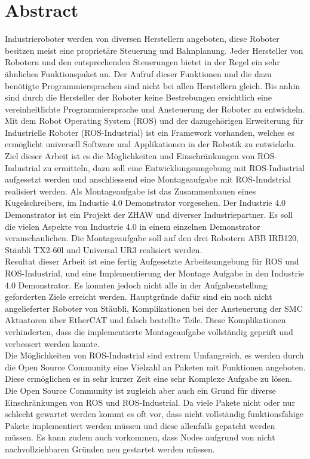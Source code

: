 \chapter*{Abstract}
\label{sec:Abstract}
Industrieroboter werden von diversen Herstellern angeboten, diese Roboter besitzen meist eine proprietäre Steuerung und Bahnplanung. Jeder Hersteller von Robotern und den entsprechenden Steuerungen bietet in der Regel ein sehr ähnliches Funktionspaket an. Der Aufruf dieser Funktionen und die dazu benötigte Programmiersprachen sind nicht bei allen Herstellern gleich. Bis anhin sind durch die Hersteller der Roboter keine Bestrebungen ersichtlich eine vereinheitlichte Programmiersprache und Ansteuerung der Roboter zu entwickeln.
Mit dem Robot Operating System (ROS) und der dazugehörigen Erweiterung für Industrielle Roboter (ROS-Industrial) ist ein Framework vorhanden, welches es ermöglicht universell Software und Applikationen in der Robotik zu entwickeln. \\

Ziel dieser Arbeit ist es die Möglichkeiten und Einschränkungen von ROS-Industrial zu ermitteln, dazu soll eine Entwicklungsumgebung mit ROS-Industrial aufgesetzt werden und anschliessend eine Montageaufgabe mit ROS-Inudstrial realisiert werden. Als Montageaufgabe ist das Zusammenbauen eines Kugelschreibers, im Industie 4.0 Demonstrator vorgesehen. Der Industrie 4.0 Demonstrator ist ein Projekt der ZHAW und diverser Industriepartner. Es soll die vielen Aspekte von Industrie 4.0 in einem einzelnen Demonstrator veranschaulichen. Die Montageaufgabe soll auf den drei Robotern ABB IRB120, Stäubli TX2-60l und Universal UR3 realisiert werden.\\

Resultat dieser Arbeit ist eine fertig Aufgesetzte Arbeitsumgebung für ROS und ROS-Industrial, und eine Implementierung der Montage Aufgabe in den Industrie 4.0 Demonstrator. Es konnten jedoch nicht alle in der Aufgabenstellung geforderten Ziele erreicht werden. Hauptgründe dafür sind ein noch nicht angelieferter Roboter von Stäubli, Komplikationen bei der Ansteuerung der SMC Aktuatoren über EtherCAT und falsch bestellte Teile. Diese Komplikationen verhinderten, dass die implementierte Montageaufgabe vollständig geprüft und verbessert werden konnte. \\

Die Möglichkeiten von ROS-Industrial sind extrem Umfangreich, es werden durch die Open Source Community eine Vielzahl an Paketen mit Funktionen angeboten. Diese ermöglichen es in sehr kurzer Zeit eine sehr Komplexe Aufgabe zu lösen. 
Die Open Source Community ist zugleich aber auch ein Grund für diverse Einschränkungen von ROS und ROS-Industrial. Da viele Pakete nicht oder nur schlecht gewartet werden kommt es oft vor, dass nicht vollständig funktionsfähige Pakete implementiert werden müssen und diese allenfalls gepatcht werden müssen. Es kann zudem auch vorkommen, dass Nodes aufgrund von nicht nachvollziehbaren Gründen neu gestartet werden müssen.
